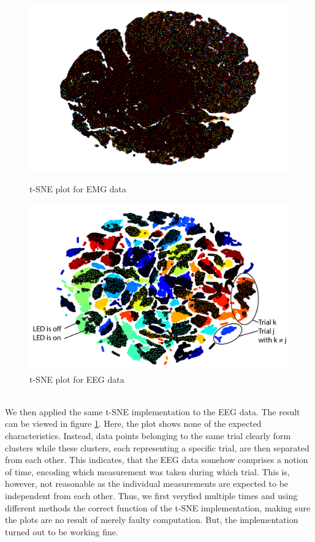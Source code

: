 \documentclass{article} %
\begin{document}
\begin{figure}
	\centering
	\begin{minipage}{0.5\textwidth}
		\centering
		\includegraphics[width=1.0\textwidth]{images/emg_tsne.png}
		\caption{t-SNE plot for EMG data}
		\label{fig:emg_tsne}
	\end{minipage}\hfill
	\begin{minipage}{0.5\textwidth}
		\centering
		\includegraphics[width=1.0\textwidth]{images/eeg_tsne.png}
		\caption{t-SNE plot for EEG data}
		\label{fig:eeg_tsne}
	\end{minipage}
\end{figure}\\
We then applied the same t-SNE implementation to the EEG data. The result can be viewed in figure \ref{fig:eeg_tsne}. Here, the plot shows none of the expected characteristics. Instead, data points belonging to the same trial clearly form clusters while these clusters, each representing a specific trial, are then separated from each other. This indicates, that the EEG data somehow comprises a notion of time, encoding which measurement was taken during which trial. This is, however, not reasonable as the individual measurements are expected to be independent from each other. Thus, we first veryfied multiple times and using different methods the correct function of the t-SNE implementation, making sure the plots are no result of merely faulty computation. But, the implementation turned out to be working fine.\\
\end{document}
